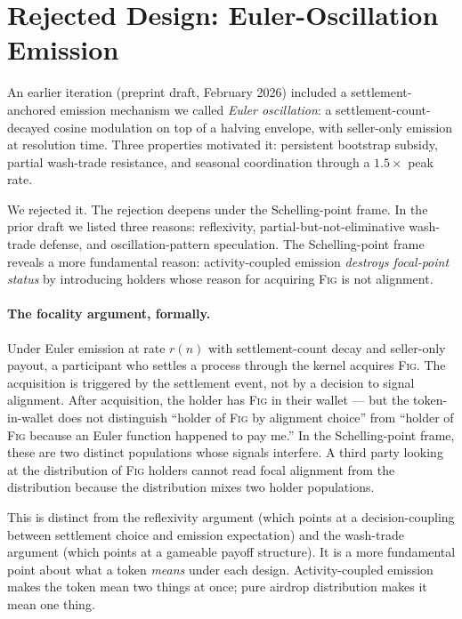 \documentclass[11pt,a4paper]{article}
\theoremstyle{definition}
\theoremstyle{remark}
\newcommand{\fig}{\textsc{Fig}}
\begin{document}
\section{Rejected Design: Euler-Oscillation Emission}
\label{sec:rejected}

An earlier iteration (preprint draft, February 2026) included
a settlement-anchored emission mechanism we called \emph{Euler
oscillation}: a settlement-count-decayed cosine modulation on
top of a halving envelope, with seller-only emission at
resolution time. Three properties motivated it: persistent
bootstrap subsidy, partial wash-trade resistance, and seasonal
coordination through a $1.5\times$ peak rate.

We rejected it. The rejection deepens under the Schelling-point
frame. In the prior draft we listed three reasons: reflexivity,
partial-but-not-eliminative wash-trade defense, and
oscillation-pattern speculation. The Schelling-point frame
reveals a more fundamental reason: activity-coupled emission
\emph{destroys focal-point status} by introducing holders whose
reason for acquiring \fig{} is not alignment.

\paragraph{The focality argument, formally.}
Under Euler emission at rate $r(n)$ with settlement-count decay
and seller-only payout, a participant who settles a process
through the kernel acquires \fig{}. The acquisition is
triggered by the settlement event, not by a decision to signal
alignment. After acquisition, the holder has \fig{} in their
wallet --- but the token-in-wallet does not distinguish
``holder of \fig{} by alignment choice'' from ``holder of
\fig{} because an Euler function happened to pay me.'' In the
Schelling-point frame, these are two distinct populations whose
signals interfere. A third party looking at the distribution of
\fig{} holders cannot read focal alignment from the
distribution because the distribution mixes two holder
populations.

This is distinct from the reflexivity argument (which points at
a decision-coupling between settlement choice and emission
expectation) and the wash-trade argument (which points at a
gameable payoff structure). It is a more fundamental point about
what a token \emph{means} under each design. Activity-coupled
emission makes the token mean two things at once; pure airdrop
distribution makes it mean one thing.
\end{document}
